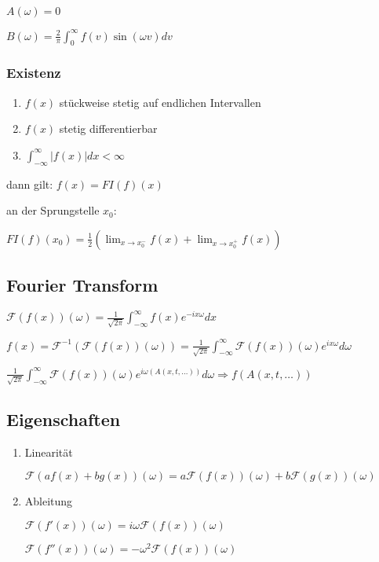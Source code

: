 \documentclass[10pt,a4paper]{scrartcl}
\newcommand{\compaqn}{\setlength{\itemsep}{0mm}\setlength{\parskip}{0cm}}%
\newcommand{\F}{\mathscr{F}}
\begin{document}
\begin{multicols*}{3}
	$A(\omega)=0$
	
	$B(\omega)=\frac{2}{\pi}\int_0^\infty{f(v)\sin(\omega v)dv}$
	
	\subsubsection{Existenz}
	
	\begin{enumerate}
	\compaqn
	\item
	$f(x)$ stückweise stetig auf endlichen Intervallen
	\item
	$f(x)$ stetig differentierbar
	\item
	$\int_{-\infty}^{\infty}{|f(x)|dx}<\infty$
	\end{enumerate}
	
	dann gilt: $f(x) = FI(f)(x)$
	
	an der Sprungstelle $x_0$: 
	
	$FI(f)(x_0) = \frac{1}{2}(\lim_{x\rightarrow x_0^-}{f(x)}+\lim_{x\rightarrow x_0^+}{f(x)})$
	
	\subsection{Fourier Transform}
	
	$\F (f(x))(\omega) = \frac{1}{\sqrt{2\pi}}\int_{-\infty}^{\infty}{f(x)e^{-ix\omega}dx}$
	
	$f(x) = \F^{-1}(\F(f(x))(\omega))=\frac{1}{\sqrt{2\pi}}\int_{-\infty}^{\infty}{\F(f(x))(\omega)e^{ix\omega}d\omega}$
	
	 	
	
	$\frac{1}{\sqrt{2\pi}}\int_{-\infty}^\infty{\F(f(x))(\omega)e^{i\omega (A(x,t,\ldots))}d\omega}\Rightarrow f(A(x,t,\ldots))$
	
	\subsection{Eigenschaften}
	
	\begin{enumerate}
	
	\item
	Linearität
	
	$\F(af(x) + bg(x))(\omega)=a\F(f(x))(\omega)+b\F(g(x))(\omega)$
	\item
	Ableitung
	
	$\F(f'(x))(\omega) = i\omega\F(f(x))(\omega)$
	
	$\F(f''(x))(\omega) = -\omega^2\F(f(x))(\omega)$
	

\end{enumerate}
\end{multicols*}
\end{document}
